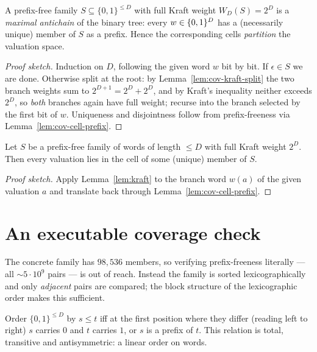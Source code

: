 \begin{lemma}\label{lem:kraft}
A prefix-free family $S \subseteq \{0,1\}^{\le D}$ with full Kraft weight
$W_D(S) = 2^D$ is a \emph{maximal antichain} of the binary tree: every
$w \in \{0,1\}^{D}$ has a (necessarily unique) member of $S$ as a prefix.
Hence the corresponding cells \emph{partition} the valuation space.
\leanok
{}
\end{lemma}
\begin{proof}[Proof sketch]
Induction on $D$, following the given word $w$ bit by bit.  If
$\epsilon \in S$ we are done.  Otherwise split at the root: by
Lemma~\ref{lem:cov-kraft-split} the two branch weights sum to
$2^{D+1} = 2^D + 2^D$, and by Kraft's inequality neither exceeds $2^D$, so
\emph{both} branches again have full weight; recurse into the branch
selected by the first bit of $w$.  Uniqueness and disjointness follow from
prefix-freeness via Lemma~\ref{lem:cov-cell-prefix}.
\end{proof}

\begin{lemma}\label{lem:cov-valuation-cover}
Let $S$ be a prefix-free family of words of length $\le D$ with full Kraft
weight $2^D$.  Then every valuation lies in the cell of some (unique)
member of $S$.
\leanok
{}
\end{lemma}
\begin{proof}[Proof sketch]
Apply Lemma~\ref{lem:kraft} to the branch word $w(a)$ of the given
valuation $a$ and translate back through Lemma~\ref{lem:cov-cell-prefix}.
\end{proof}

\section{An executable coverage check}

The concrete family has $98{,}536$ members, so verifying prefix-freeness
literally --- all ${\sim}5 \cdot 10^9$ pairs --- is out of reach.  Instead
the family is sorted lexicographically and only \emph{adjacent} pairs are
compared; the block structure of the lexicographic order makes this
sufficient.

\begin{definition}\label{def:cov-lex}
Order $\{0,1\}^{\le D}$ by $s \le t$ iff at the first position where they
differ (reading left to right) $s$ carries $0$ and $t$ carries $1$, or $s$
is a prefix of $t$.  This relation is total, transitive and antisymmetric:
a linear order on words.
\leanok
\end{definition}

